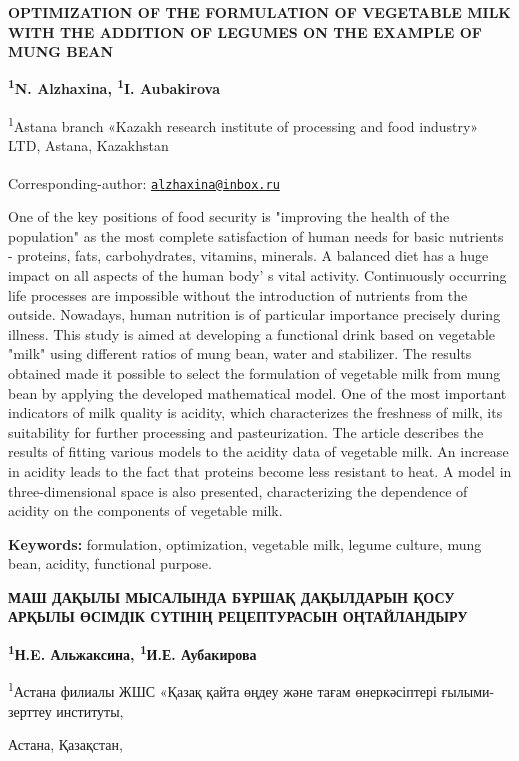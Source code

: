
{\bfseries OPTIMIZATION OF THE FORMULATION OF VEGETABLE MILK WITH THE
ADDITION OF LEGUMES ON THE EXAMPLE OF MUNG BEAN}

{\bfseries \textsuperscript{1}N. Alzhaxina\textsuperscript{\envelope },
\textsuperscript{1}I. Aubakirova}

\textsuperscript{1}Astana branch «Kazakh research institute of
processing and food industry» LTD, Astana, Kazakhstan

{\bfseries \textsuperscript{\envelope }}Corresponding-author:
\href{mailto:alzhaxina@inbox.ru}{\nolinkurl{alzhaxina@inbox.ru}}

One of the key positions of food security is "improving the health of
the population" as the most complete satisfaction of human needs for
basic nutrients - proteins, fats, carbohydrates, vitamins, minerals. A
balanced diet has a huge impact on all aspects of the human
body' s vital activity. Continuously occurring life
processes are impossible without the introduction of nutrients from the
outside. Nowadays, human nutrition is of particular importance precisely
during illness. This study is aimed at developing a functional drink
based on vegetable "milk" using different ratios of mung bean, water and
stabilizer. The results obtained made it possible to select the
formulation of vegetable milk from mung bean by applying the developed
mathematical model. One of the most important indicators of milk quality
is acidity, which characterizes the freshness of milk, its suitability
for further processing and pasteurization. The article describes the
results of fitting various models to the acidity data of vegetable milk.
An increase in acidity leads to the fact that proteins become less
resistant to heat. A model in three-dimensional space is also presented,
characterizing the dependence of acidity on the components of vegetable
milk.

{\bfseries Keywords:} formulation, optimization, vegetable milk, legume
culture, mung bean, acidity, functional purpose.

{\bfseries МАШ ДАҚЫЛЫ МЫСАЛЫНДА БҰРШАҚ ДАҚЫЛДАРЫН ҚОСУ АРҚЫЛЫ ӨСІМДІК
СҮТІНІҢ РЕЦЕПТУРАСЫН ОҢТАЙЛАНДЫРУ}

{\bfseries \textsuperscript{1}Н.E. Альжаксина\textsuperscript{\envelope },
\textsuperscript{1}И.Е. Аубакирова}

\textsuperscript{1}Астана филиалы ЖШС «Қазақ қайта өңдеу және тағам
өнеркәсіптері ғылыми-зерттеу институты,

Астана, Қазақстан,

